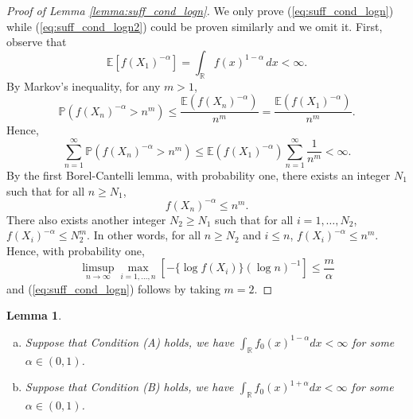 \documentclass[12pt,letterpaper, twoside, openany]{article}
\theoremstyle{plain}
\newtheorem{lemma}[theorem]{Lemma}
\begin{document}
\begin{proof}[Proof of Lemma \ref{lemma:suff_cond_logn}]
We only prove (\ref{eq:suff_cond_logn}) while (\ref{eq:suff_cond_logn2}) could be proven similarly and we omit it.	First, observe that
\begin{equation*}
	\mathbb{E}[ f(X_1)^{-\alpha}]  = \int_\mathbb{R} f(x)^{1- \alpha} \, dx < \infty.
\end{equation*}
By Markov's inequality, for any $m > 1$,
\begin{equation*}
	\mathbb{P}(f(X_n)^{-\alpha} > n^m) \leq \frac{ \mathbb{E}(f(X_n)^{-\alpha})}{n^m} = \frac{ \mathbb{E}(f(X_1)^{-\alpha})}{n^m}.
\end{equation*}
Hence,
\begin{equation*}
	\sum^\infty_{n=1} \mathbb{P}(f(X_n)^{-\alpha} > n^m) \leq \mathbb{E}(f(X_1)^{-\alpha}) \sum^\infty_{n=1} \frac{1}{n^m} < \infty.
\end{equation*}
By the first Borel-Cantelli lemma, with probability one, there exists an integer $N_1$ such that for all $n \geq N_1$,
\begin{equation*}
	f(X_n)^{-\alpha} \leq n^{m}.
\end{equation*}
There also exists another integer $N_2 \geq N_1$ such that for all $i=1,\ldots,N_2$,  $f(X_i)^{-\alpha} \leq N^{m}_2$. In other words, for all $n \geq N_2$ and  $i \leq n$, $f(X_i)^{-\alpha} \leq n^{m}$.	Hence, with probability one,
\begin{equation*}
	\limsup_{n \rightarrow \infty}  \max_{i=1,\ldots,n} [ - \{\log f(X_i)\} (\log n)^{-1}] \leq \frac{m}{\alpha}
\end{equation*}
and (\ref{eq:suff_cond_logn}) follows by taking $m = 2$.


\end{proof}


\begin{lemma}\label{lemma:tail_condition_imply_integral_alpha_finite}

    \begin{enumerate}[(a)]
        \item Suppose that Condition (A) holds, we have $\int_{\mathbb{R}}f_0(x)^{1- \alpha} dx < \infty$ for some $\alpha \in (0, 1)$.
       
        \item Suppose that Condition (B) holds, we have $\int_{\mathbb{R}}f_0(x)^{1+ \alpha} dx < \infty$ for some $\alpha \in (0, 1)$.
    \end{enumerate}
    
\end{lemma}
\end{document}
